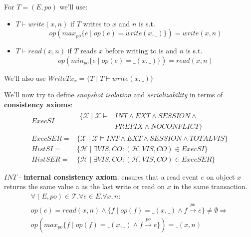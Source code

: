 \documentclass{beamer}
\begin{document}
\begin{frame}
	For $T = (E, po)$ we'll use:
	\begin{itemize}
		\item $ T \vdash write(x,n) $ if $T$ writes to $x$ and $n$ is s.t.
		$$ op\left(max_{po}\{e \mid op\left(e\right)  = write\left(x, \_ \right) \} \right) = write(x,n)$$
		\item $ T \vdash read(x,n) $ if $T$ reads $x$ before writing to is and $n$ is s.t.
		$$ op\left(min_{po}\{e \mid op\left(e\right)  = \_\left(x, \_ \right) \} \right) = read(x,n)$$
	\end{itemize}
	We'll also use $ WriteTx_x = \{ T \mid T \vdash write(x,\_)\}$
\end{frame}

\begin{frame}
	We'll now try to define \emph{snapshot isolation} and \emph{serializability} in terms of \textbf{consistency axioms}:
	\begin{equation*}
		\begin{aligned}
			ExecSI = {} &
				\begin{aligned} 
					\{ \mathcal{X} \mid \mathcal{X} \vDash & INT \wedge EXT \wedge SESSION \wedge \\
														& PREFIX \wedge NOCONFLICT \}
				\end{aligned}
				\\
			ExecSER = {} & \{ \mathcal{X} \mid \mathcal{X} \vDash INT \wedge EXT \wedge SESSION \wedge TOTALVIS \} \\
			HistSI = {} & \{ \mathcal{H} \mid \exists VIS,CO : (\mathcal{H}, VIS, CO) \in ExecSI \} \\
			HistSER = {} & \{ \mathcal{H} \mid \exists VIS,CO : (\mathcal{H}, VIS, CO) \in ExecSER \} 
		\end{aligned}
	\end{equation*}
\end{frame}

\begin{frame}
	$INT$ - \textbf{internal consistency axiom}: ensures that a read event $e$ on object $x$ returns the same value a as the last write or read on $x$ in the same transaction.
	\begin{multline*}
		\forall (E,po)\in \mathcal{T} . \forall e \in E . \forall x,n: \\
			op(e) = read(x,n) \wedge \{f\mid op(f) = \_(x,\_)\wedge f \overset{po}{\longrightarrow} e\} \ne \emptyset \Rightarrow \\
			op\left(max_{po}\{f \mid op\left(f\right) = \_ \left(x, \_\right) \wedge f \overset{po}{\longrightarrow} e\}\right) = \_(x,n)
	\end{multline*}
\end{frame}
\end{document}
